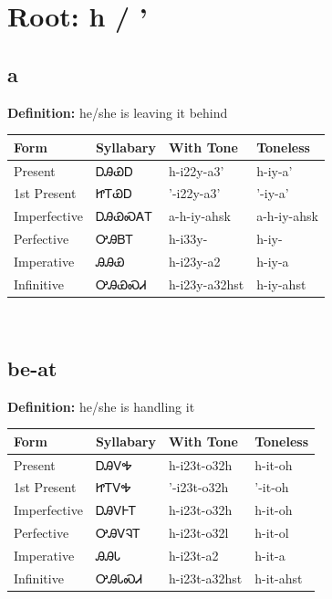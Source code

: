 \documentclass{article}%
\begin{document}
%
\normalsize%
\section*{Root: h / '}%
\subsection*{a}%
\textbf{Definition: }%
he/she is leaving it behind%
\\[0.5em]%
\begin{tabular}{|l|l|l|l|}%
\hline%
\textbf{Form}&\textbf{Syllabary}&\textbf{With Tone}&\textbf{Toneless}\\%
\hline%
Present&ᎠᎯᏯᎠ&h{-}i22y{-}a3'&h{-}iy{-}a'\\%
1st Present&ᏥᎢᏯᎠ&'{-}i22y{-}a3'&'{-}iy{-}a'\\%
Imperfective&ᎠᎯᏯᏍᎪᎢ&a{-}h{-}iy{-}ahsk&a{-}h{-}iy{-}ahsk\\%
Perfective&ᎤᎯᏴᎢ&h{-}i33y{-}&h{-}iy{-}\\%
Imperative&ᎯᎯᏯ&h{-}i23y{-}a2&h{-}iy{-}a\\%
Infinitive&ᎤᎯᏯᏍᏗ&h{-}i23y{-}a32hst&h{-}iy{-}ahst\\%
\hline%
\end{tabular}%
\\[1em]%
\subsection*{be-at}%
\textbf{Definition: }%
he/she is handling it%
\\[0.5em]%
\begin{tabular}{|l|l|l|l|}%
\hline%
\textbf{Form}&\textbf{Syllabary}&\textbf{With Tone}&\textbf{Toneless}\\%
\hline%
Present&ᎠᎯᏙᎭ&h{-}i23t{-}o32h&h{-}it{-}oh\\%
1st Present&ᏥᎢᏙᎭ&'{-}i23t{-}o32h&'{-}it{-}oh\\%
Imperfective&ᎠᎯᏙᎰᎢ&h{-}i23t{-}o32h&h{-}it{-}oh\\%
Perfective&ᎤᎯᏙᎸᎢ&h{-}i23t{-}o32l&h{-}it{-}ol\\%
Imperative&ᎯᎯᏓ&h{-}i23t{-}a2&h{-}it{-}a\\%
Infinitive&ᎤᎯᏓᏍᏗ&h{-}i23t{-}a32hst&h{-}it{-}ahst\\%
\hline%
\end{tabular}%
\\[1em]%
\end{document}

